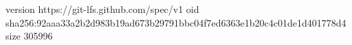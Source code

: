 version https://git-lfs.github.com/spec/v1
oid sha256:92aaa33a2b2d983b19ad673b29791bbc04f7ed6363e1b20c4c01de1d401778d4
size 305996
